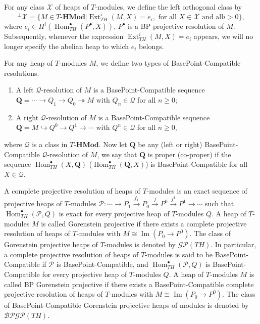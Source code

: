 \documentclass[11pt, twoside]{article}
\begin{document}
\begin{definition}
For any class $\mathcal{X}$ of heaps of $T$-modules, we define the left orthogonal class by
$$^{\bot}\mathcal{X} = \{M \in T\textbf{-HMod} | \operatorname{Ext}_{TH}^i(M,X) = e_i,\text{ for all }X\in \mathcal{X}\text{ and all
}i>0\},$$
where $e_i \in H^i(\operatorname{Hom}^\bullet_{TH}(P^\bullet, X))$, $P^\bullet$ is a BP projective resolution of $M$.\\

Subsequently, whenever the expression $\operatorname{Ext}_{TH}^i(M,X) = e_i$ appears, we will no longer specify the abelian heap to which \(e_i\) belongs.
\end{definition}

\begin{definition}
For any heap of $T$-modules $M$, we define two types of BasePoint-Compatible resolutions.
\begin{enumerate}
    \item[(i)] A left $\mathcal{Q}$-resolution of $M$ is a BasePoint-Compatible sequence $\mathbf{Q}=\cdots \rightarrow Q_1 \rightarrow Q_0 \twoheadrightarrow M$ with $Q_n\in \mathcal{Q}$ for all $n\geq 0$;
    \item[(ii)] A right $\mathcal{Q}$-resolution of $M$ is a BasePoint-Compatible sequence $\mathbf{Q}=M \hookrightarrow Q^0 \rightarrow Q^1 \rightarrow \cdots$ with $Q^n\in \mathcal{Q}$ for all $n\geq 0$,
\end{enumerate}
 where $\mathcal{Q}$ is a class in $T\textbf{-HMod}$. Now let $\mathbf{Q}$ be any (left or right) BasePoint-Compatible $\mathcal{Q}$-resolution of $M$, we say that $\mathbf{Q}$ is proper (co-proper) if the sequence $\operatorname{Hom}^\bullet_{TH}(X, \mathbf{Q})$ ($\operatorname{Hom}^\bullet_{TH}(\mathbf{Q}, X)$) is BasePoint-Compatible for all $X\in \mathcal{Q}$.
\end{definition}

\begin{definition}
A complete projective resolution of heaps of $T$-modules is an exact sequence of projective heaps of $T$-modules $\mathcal{P}: \cdots \to P_1 \xrightarrow{f_1} P_0 \xrightarrow{f} P^0 \xrightarrow{f^1} P^1 \to \cdots$ such that $\operatorname{Hom}^\bullet_{TH}(\mathcal{P}, Q)$ is exact for every projective heap of $T$-modules $Q$. A heap of $T$-modules $M $ is called Gorenstein projective if there exists a complete projective resolution of heaps of $T$-modules with $M \cong \operatorname{Im}(P_0 \to P^0)$. The class of Gorenstein projective heaps of $T$-modules is denoted by $\mathcal{GP}(TH)$. In particular, a complete projective resolution of heaps of $T$-modules is said to be BasePoint-Compatible if $\mathcal{P}$ is BasePoint-Compatible, and $\operatorname{Hom}^\bullet_{TH}(\mathcal{P}, Q)$ is BasePoint-Compatible for every projective heap of $T$-modules $Q$. A heap of $T$-modules $M$ is called BP Gorenstein projective if there exists a BasePoint-Compatible complete projective resolution of heaps of $T$-modules with $M \cong \operatorname{Im}(P_0 \to P^0)$. The class of BasePoint-Compatible Gorenstein projective heaps of modules is denoted by $\mathcal{BPGP}(TH)$.
\end{definition}
\end{document}
